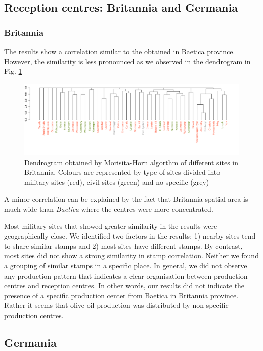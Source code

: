\documentclass[review]{elsarticle}
\begin{document}
\subsection{Reception centres: Britannia and Germania}

\subsubsection{Britannia}

The results show a correlation similar to the obtained in Baetica province. However, the similarity is less pronounced as we observed in the dendrogram in Fig. \ref{britmap}


\begin{figure}[htp]
	\centering
\includegraphics[width=\linewidth]{figs/dendrobrit5.pdf}
\caption{Dendrogram obtained by Morisita-Horn algorthm of different sites in Britannia. Colours are represented by type of sites divided into military sites (red), civil sites (green) and no specific (grey)}
\label{britmap}
\end{figure}


A minor correlation can be explained by the fact that Britannia spatial area is much wide than \textit{Baetica} where the centres were more concentrated.

Most military sites that showed greater similarity in the results were geographically close. We identified two factors in the results: 1) nearby sites tend to share similar stamps and 2) most sites have different stamps. 
By contrast, most sites did not show a strong similarity in stamp correlation. Neither we found a grouping of similar stamps in a specific place. In general, we did not observe any production pattern that indicates a clear organisation between production centres and reception centres. In other words, our results did not indicate the presence of a specific production center from Baetica in Britannia province. Rather it seems that olive oil production was distributed by non specific production centres. 


\subsection{Germania}
\end{document}
